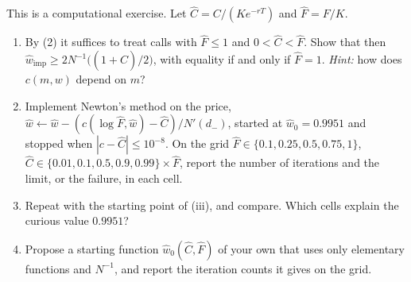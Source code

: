 \begin{exercise}\label{ex:bsf-course-newton}
\medium This is a computational exercise. Let $\hat C=C/(Ke^{-rT})$ and $\hat F=F/K$.
\begin{enumerate}[label=(\alph*)]
  \item By (2) it suffices to treat calls with $\hat F\le1$ and $0<\hat C<\hat F$.
    Show that then $\hat w_{\mathrm{imp}}\ge2N^{-1}\big((1+\hat C)/2\big)$, with equality if and only if $\hat F=1$.
    \emph{Hint:} how does $c(m,w)$ depend on $m$?
  \item Implement Newton's method on the price, $\hat w\leftarrow\hat w-(c(\log\hat F,\hat w)-\hat C)/N'(d_-)$,
    started at $\hat w_0=0.9951$ and stopped when $|c-\hat C|\le10^{-8}$. On the grid
    $\hat F\in\{0.1,0.25,0.5,0.75,1\}$, $\hat C\in\{0.01,0.1,0.5,0.9,0.99\}\times\hat F$, report the number of
    iterations and the limit, or the failure, in each cell.
  \item Repeat with the starting point of (iii), and compare. Which cells
    explain the curious value $0.9951$?
  \item Propose a starting function $\hat w_0(\hat C,\hat F)$ of your own that uses only elementary functions
    and $N^{-1}$, and report the iteration counts it gives on the grid.
\end{enumerate}
\end{exercise}

